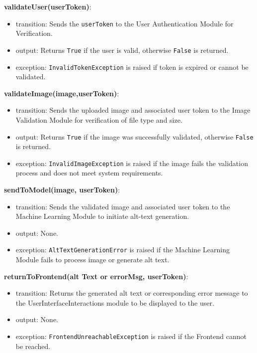 \documentclass[12pt, titlepage]{article}
\begin{document}
\noindent \textbf{validateUser(userToken)}:
\begin{itemize}
  \item transition: Sends the \texttt{userToken} to the User
    Authentication Module for Verification.
  \item output: Returns \texttt{True} if the user is valid, otherwise
    \texttt{False} is returned.
  \item exception: \texttt{InvalidTokenException} is raised if token
    is expired or cannot be validated.
\end{itemize}

\noindent \textbf{validateImage(image,userToken)}:
\begin{itemize}
  \item transition: Sends the uploaded image and associated user
    token to the Image Validation Module for verification of file type and size.
  \item output:  Returns \texttt{True} if the image was successfully
    validated, otherwise \texttt{False} is returned.
  \item exception:  \texttt{InvalidImageException} is raised if the
    image fails the validation process and does not meet system requirements.
\end{itemize}

\noindent \textbf{sendToModel(image, userToken)}:
\begin{itemize}
  \item transition: Sends the validated image and associated user
    token to the Machine Learning Module to initiate alt-text generation.
  \item output:  None.
  \item exception: \texttt{AltTextGenerationError} is raised if the
    Machine Learning Module fails to process image or generate alt text.
\end{itemize}

\noindent \textbf{returnToFrontend(alt Text or errorMsg, userToken)}:
\begin{itemize}
  \item transition: Returns the generated alt text or corresponding
    error message to the UserInterfaceInteractions module to be displayed to the user. 
  \item output:  None.
  \item exception: \texttt{FrontendUnreachableException} is raised if
    the Frontend cannot be reached.
\end{itemize}
\end{document}
